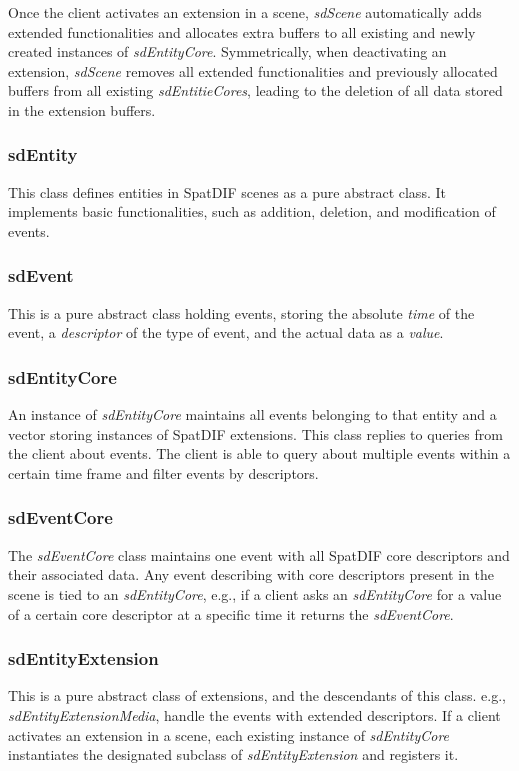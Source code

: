 \documentclass{article}
\begin{document}
Once the client activates an extension in a scene, \emph{sdScene} automatically adds extended functionalities and allocates extra buffers to all existing and newly created instances of \emph{sdEntityCore}. 
Symmetrically, when deactivating an extension, \emph{sdScene} removes all extended functionalities and previously allocated buffers from all existing \emph{sdEntitieCores}, leading to the deletion of all data stored in the extension buffers.

\subsubsection*{sdEntity}
This class defines entities in SpatDIF scenes as a pure abstract class. It implements basic functionalities, such as addition, deletion, and modification of events.

\subsubsection*{sdEvent}
This is a pure abstract class holding events, storing the absolute \emph{time} of the event, a \emph{descriptor} of the type of event, and the actual data as a \emph{value}.

\subsubsection*{sdEntityCore}
An instance of \emph{sdEntityCore} maintains all events belonging to that entity and a vector storing instances of SpatDIF extensions. 
This class replies to queries from the client about events.
The client is able to query about multiple events within a certain time frame and filter events by descriptors.

\subsubsection*{sdEventCore}
The \emph{sdEventCore} class maintains one event with all SpatDIF core descriptors and their associated data.
Any event describing with core descriptors present in the scene is tied to an \emph{sdEntityCore}, e.g., if a client asks an \emph{sdEntityCore} for a value of a certain core descriptor at a specific time it returns the \emph{sdEventCore}. 

\subsubsection*{sdEntityExtension}
This is a pure abstract class of extensions, and the descendants of this class. e.g., \emph{sdEntityExtensionMedia}, handle the events with extended descriptors. 
If a client activates an extension in a scene, each existing instance of \emph{sdEntityCore} instantiates the designated subclass of \emph{sdEntityExtension} and registers it.
\end{document}
